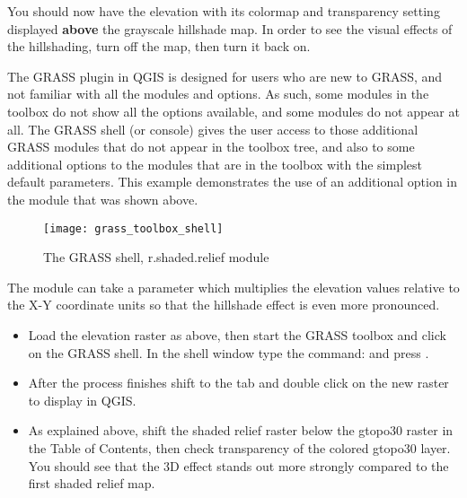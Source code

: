 You should now have the  elevation with its colormap and
transparency setting displayed \textbf{above} the grayscale hillshade map. In
order to see the visual effects of the hillshading, turn off the
 map, then turn it back on.


The GRASS plugin in QGIS is designed for users who are new to GRASS, and not
familiar with all the modules and options. As such, some modules in the
toolbox do not show all the options available, and some modules do not appear
at all. The GRASS shell (or console) gives the user access to those
additional GRASS modules that do not appear in the toolbox tree, and also to
some additional options to the modules that are in the toolbox with the
simplest default parameters. This example demonstrates the use of an
additional option in the  module that was shown
above.

\begin{figure}[ht]
 \centering
 \texttt{[image: grass\_toolbox\_shell]}
 \caption{The GRASS shell, r.shaded.relief module \nixcaption}\label{fig:grass_toolbox_shell}
\end{figure}

The module  can take a parameter 
which multiplies the elevation values relative to the X-Y coordinate units so
that the hillshade effect is even more pronounced.

\begin{itemize}[label=--]
\item Load the  elevation raster as above, then start the
GRASS toolbox and click on the GRASS shell. In the shell window type the
command:\linebreak
{} \linebreak and press .
\end{itemize}

\begin{itemize}[label=--]
\item After the process finishes shift to the  tab and double click on
the new  raster to display in QGIS.
\item As explained above, shift the shaded relief raster below the gtopo30
raster in the Table of Contents, then check transparency of the colored
gtopo30 layer. You should see that the 3D effect stands out more strongly
compared to the first shaded relief map.
\end{itemize}

